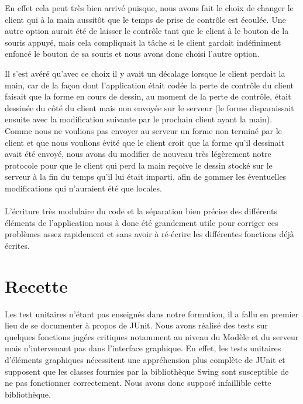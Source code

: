 \documentclass[a4paper,11pt]{article}
\begin{document}
En effet cela peut très bien arrivé puisque, nous avons fait le choix de changer le client qui à la main aussitôt que le temps de prise de contrôle est écoulée. Une autre option aurait été de laisser le contrôle tant que le client à le bouton de la souris appuyé, mais cela compliquait la tâche si le client gardait indéfiniment enfoncé le bouton de sa souris et nous avons donc choisi l'autre option.

Il s'est avéré qu'avec ce choix il y avait un décalage lorsque le client perdait la main, car de la façon dont l'application était codée la perte de contrôle du client faisait que la forme en cours de dessin, au moment de la perte de contrôle, était dessinée du côté du client mais non envoyée sur le serveur (le forme disparaissait ensuite avec la modification suivante par le prochain client ayant la main). Comme nous ne voulions pas envoyer au serveur un forme non terminé par le client et que nous voulions évité que le client croit que la forme qu'il dessinait avait été envoyé, nous avons du modifier de nouveau très légèrement notre protocole pour que le client qui perd la main reçoive le dessin stocké sur le serveur à la fin du temps qu'il lui était imparti, afin de gommer les éventuelles modifications qui n'auraient été que locales.

\paragraph{} L'écriture très modulaire du code et la séparation bien précise des différents éléments de l'application nous à donc été grandement utile pour corriger ces problèmes assez rapidement et sans avoir à ré-écrire les différentes fonctions déjà écrites.

\section{Recette}

Les test unitaires n'\'etant pas enseign\'es dans notre formation, il a fallu en premier lieu de se documenter \`a propos de JUnit. Nous avons r\'ealis\'e des tests sur quelques fonctions jugées critiques notamment au niveau du Modèle et du serveur mais n'intervenant pas dans l'interface graphique. En effet, les tests unitaires d'\'el\'ements graphiques n\'ecessitent une appr\'ehension plus compl\`ete de JUnit et supposent que les classes fournies par la biblioth\`eque Swing sont susceptible de ne pas fonctionner correctement. Nous avons donc suppos\'e infaillible cette biblioth\`eque.
\end{document}
